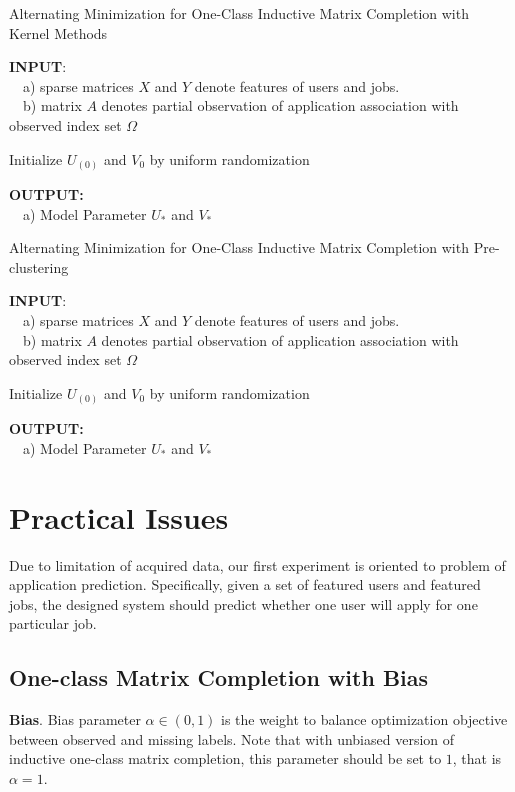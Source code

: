\documentclass{article} %
\begin{document}
\begin{algorithm}
    \caption{Alternating Minimization for 
        One-Class Inductive Matrix Completion with Kernel Methods}
    \label{alg:kernel}
    \begin{algorithmic}[1]

\State \textbf{INPUT}: \\ \ \ a) sparse matrices $X$ and $Y$ denote features of users
and jobs. \\ \ \ b) matrix $A$ denotes partial observation of application
association with observed index set $\Omega$
\State \

\State Initialize $U_{(0)}$ and $V_{0}$ by uniform randomization
\State \

\State \textbf{OUTPUT: } \\ 
\ \ a) Model Parameter $ U_{*}$ and $V_{*}$ 
\end{algorithmic}
\end{algorithm}

\begin{algorithm}
    \caption{Alternating Minimization for 
        One-Class Inductive Matrix Completion with Pre-clustering}
    \label{alg:prec}
    \begin{algorithmic}[1]

\State \textbf{INPUT}: \\ \ \ a) sparse matrices $X$ and $Y$ denote features of users
and jobs. \\ \ \ b) matrix $A$ denotes partial observation of application
association with observed index set $\Omega$
\State \

\State Initialize $U_{(0)}$ and $V_{0}$ by uniform randomization
\State \

\State \textbf{OUTPUT: } \\ 
\ \ a) Model Parameter $ U_{*}$ and $V_{*}$ 
\end{algorithmic}
\end{algorithm}

\section{Practical Issues}
Due to limitation of acquired data, our first experiment is oriented to
problem of application prediction. Specifically, given a set of featured users
and featured jobs, the designed system should predict whether one user will
apply for one particular job.

\subsection{One-class Matrix Completion with Bias} %
\textbf{Bias}. Bias parameter $\alpha \in (0, 1)$ is the weight to balance
optimization objective between observed and missing labels. Note that with
unbiased version of inductive one-class matrix completion, this parameter
should be set to $1$, that is $\alpha = 1$.
\end{document}
